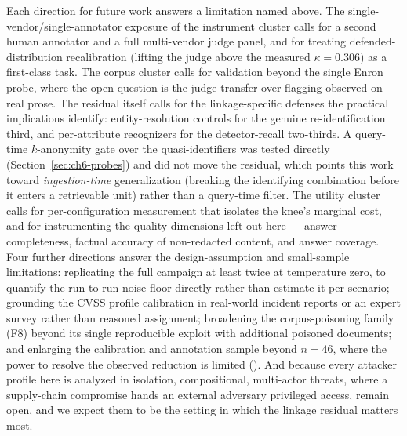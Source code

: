 \documentclass[11pt,a4paper]{report}
\begin{document}
Each direction for future work answers a limitation named above. The single-vendor/single-annotator
exposure of the instrument cluster calls for a second human annotator and a full multi-vendor
judge panel, and for treating defended-distribution recalibration (lifting the judge above the
measured $\kappa = 0.306$) as a first-class task. The corpus cluster calls for validation
beyond the single Enron probe, where the open question is the judge-transfer over-flagging
observed on real prose. The residual itself calls for the linkage-specific defenses the practical
implications identify: entity-resolution controls for the genuine re-identification third, and
per-attribute recognizers for the detector-recall two-thirds. A query-time $k$-anonymity gate over
the quasi-identifiers was tested directly (Section~\ref{sec:ch6-probes}) and did not move the
residual, which points this work toward \emph{ingestion-time} generalization (breaking the
identifying combination before it enters a retrievable unit) rather than a query-time filter. The utility cluster calls for
per-configuration measurement that isolates the knee's marginal cost, and for instrumenting the
quality dimensions left out here --- answer completeness, factual accuracy of non-redacted content,
and answer coverage. Four further directions answer the design-assumption and small-sample
limitations: replicating the full campaign at least twice at temperature zero, to quantify the
run-to-run noise floor directly rather than estimate it per scenario; grounding the CVSS profile
calibration in real-world incident reports or an expert survey rather than reasoned assignment;
broadening the corpus-poisoning family (F8) beyond its single reproducible exploit with additional
poisoned documents; and enlarging the calibration and annotation sample beyond $n = 46$, where the
power to resolve the observed reduction is limited (). And because every attacker
profile here is analyzed in isolation, compositional, multi-actor threats, where a
supply-chain compromise hands an external adversary privileged access, remain open, and we
expect them to be the setting in which the linkage residual matters most.

\ifdefined\ThesisMaster\else
  
  
  
\end{document}
